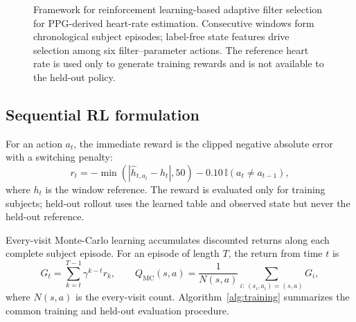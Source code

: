 \documentclass{elektr}
\begin{document}
\begin{figure}[t]
{%
}
\caption{Framework for reinforcement learning-based adaptive filter selection
for PPG-derived heart-rate estimation. Consecutive windows form chronological
subject episodes; label-free state features drive selection among six
filter--parameter actions. The reference heart rate is used only to generate
training rewards and is not available to the held-out policy.}
\label{fig:framework}
\end{figure}

\subsection{Sequential RL formulation}

For an action $a_t$, the immediate reward is the clipped negative absolute error with a switching penalty:
\begin{equation}
 r_t=-\min\left(|\widehat h_{t,a_t}-h_t|,50\right)-0.10\,\mathbb{I}(a_t\ne a_{t-1}),
 \label{eq:reward}
\end{equation}
where $h_t$ is the window reference. The reward is evaluated only for training subjects; held-out rollout uses the learned table and observed state but never the held-out reference.

Every-visit Monte-Carlo learning accumulates discounted returns along each complete subject episode. For an episode of length $T$, the return from time $t$ is
\begin{equation}
 G_t=\sum_{k=t}^{T-1}\gamma^{k-t}r_k,
 \qquad
 Q_{\mathrm{MC}}(s,a)=\frac{1}{N(s,a)}\sum_{i:\,(s_i,a_i)=(s,a)}G_i,
 \label{eq:mc}
\end{equation}
where $N(s,a)$ is the every-visit count. Algorithm~\ref{alg:training}
summarizes the common training and held-out evaluation procedure.
\end{document}
